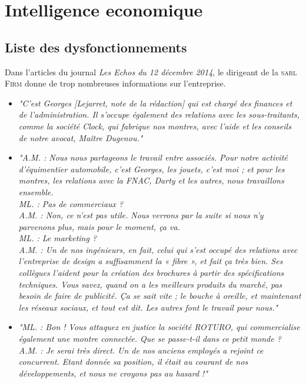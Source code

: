 \chapter{Intelligence economique}
\thispagestyle{fancy}

\section{Liste des dysfonctionnements}
Dans l'articles du journal \textit{Les Echos du 12 décembre 2014}, le dirigeant de la \textsc{sarl Firm} donne de trop nombreuses informations sur l'entreprise.\\
\begin{itemize}
\item \emph{"C’est Georges [Lejarret, note de la rédaction] qui est chargé des finances et de l’administration. Il s’occupe également des relations avec les sous-traitants, comme la société Clock, qui fabrique nos montres, avec l’aide et les conseils de notre avocat, Maître Dugenou."}
\item \emph{"A.M. : Nous nous partageons le travail entre associés. Pour notre activité d’équimentier automobile, c’est Georges, les jouets, c’est moi ; et pour les montres, les relations avec la FNAC, Darty et les autres, nous travaillons ensemble.\\
ML. : Pas de commerciaux ?\\
A.M. : Non, ce n’est pas utile. Nous verrons par la suite si nous n’y parvenons plus, mais pour le
moment, ça va.\\
ML. : Le marketing ?\\
A.M. : Un de nos ingénieurs, en fait, celui qui s’est occupé des relations avec l’entreprise de design a suffisamment la « fibre », et fait ça très bien. Ses collègues l’aident pour la création des brochures à partir des spécifications techniques. Vous savez, quand on a les meilleurs produits du marché, pas besoin de faire de publicité. Ça se sait vite ; le bouche à oreille, et maintenant les réseaux sociaux, et tout est dit. Les autres font le travail pour nous."}
\item \emph{"ML. : Bon ! Vous attaquez en justice la société ROTURO, qui commercialise également une montre
connectée. Que se passe-t-il dans ce petit monde ?\\
A.M. : Je serai très direct. Un de nos anciens employés a rejoint ce concurrent. Etant donnée sa position, il était au courant de nos développements, et nous ne croyons pas au hasard !"}
\end{itemize}
